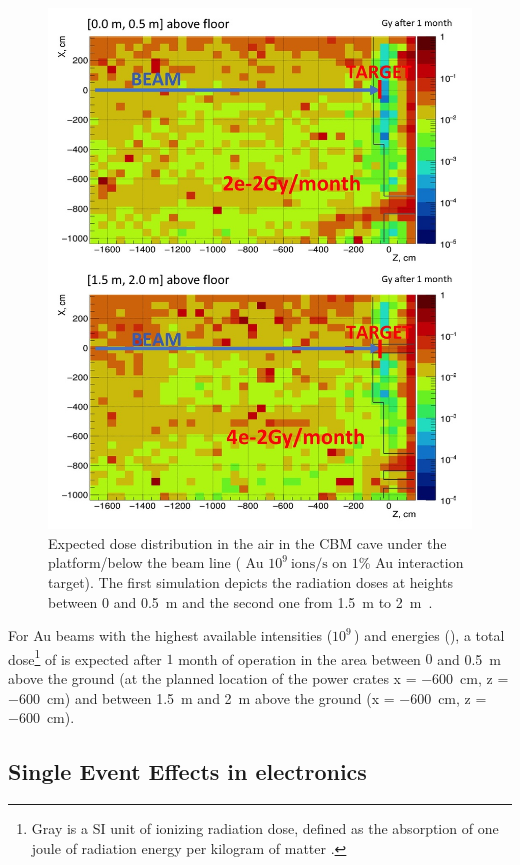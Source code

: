 \begin{figure}[!h]
    \centering
    \includegraphics[width=0.7\columnwidth]{Chapter4/images/Dose00.jpg}
    \caption{Expected dose distribution in the air in the \gls{CBM}
cave under the platform/below the beam line  ( Au $10^{9} \mathrm{\ ions/s}$ on $1$\% Au
interaction target). The first simulation depicts the radiation doses at heights between 0 and \SI{0.5}{\metre} and the second one from \SI{1.5}{\metre} to \SI{2}{\metre}~\cite{fluka_senger}.} 
    \label{fig:mCBM}
\end{figure}
For Au beams with the highest available intensities 
($10^{9}\,$\ionss) and energies 
(), a total dose\footnote{Gray is a SI unit of ionizing radiation dose, defined as the absorption of one joule of radiation energy per kilogram of matter \cite{gray}.} of  is expected after $1$ month of operation in the area between $0$ and \SI{0.5}{\metre} above the ground (at the planned location of the power crates x = \SI{-600}{\centi\metre}, z = \SI{-600}{\centi\metre}) and  between \SI{1.5}{\metre} and \SI{2}{\metre} above the ground (x = \SI{-600}{\centi\metre}, z = \SI{-600}{\centi\metre}).
 


\subsection{Single Event Effects in electronics}

